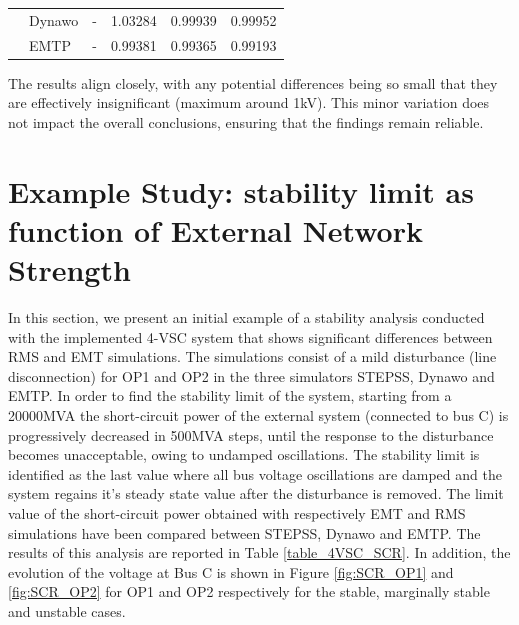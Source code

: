 \documentclass{report}
\begin{document}
\begin{table}[H]
\begin{tabular}{ll|c|c|c|c|}
\multicolumn{1}{l|}{}                                   & Dynawo & -                                                                                 & 1.03284                                                                      & 0.99939                                                                             & 0.99952                                                                       \\
\multicolumn{1}{l|}{}                                   & EMTP   & -                                                                                 & 0.99381                                                                  & 0.99365                                                                             & 0.99193                                                                  
\end{tabular}
\label{table_4VSC_results_fault_line_disconnect}
\end{table}
The results align closely, with any potential differences being so small that they are effectively insignificant (maximum around 1kV). This minor variation does not impact the overall conclusions, ensuring that the findings remain reliable.

\section{Example Study: stability limit as function of External Network Strength}
In this section, we present an initial example of a stability analysis conducted with the implemented 4-VSC system that shows significant differences between RMS and EMT simulations. The simulations consist of a mild disturbance (line disconnection) for OP1 and OP2 in the three simulators STEPSS, Dynawo and EMTP.
In order to find the stability limit of the system, starting from a 20000MVA the short-circuit power of the external system (connected to bus C) is progressively decreased in 500MVA steps, until the response to the disturbance becomes unacceptable, owing to undamped oscillations. The stability limit is identified as the last value where all bus voltage oscillations are damped and the system regains it's steady state value after the disturbance is removed. The limit value of the short-circuit power obtained with respectively EMT and RMS simulations have been compared between STEPSS, Dynawo and EMTP. The results of this analysis are reported in Table \ref{table_4VSC_SCR}. In addition, the evolution of the voltage at Bus C is shown in Figure \ref{fig:SCR_OP1} and \ref{fig:SCR_OP2} for OP1 and OP2 respectively for the stable, marginally stable and unstable cases.
\end{document}
